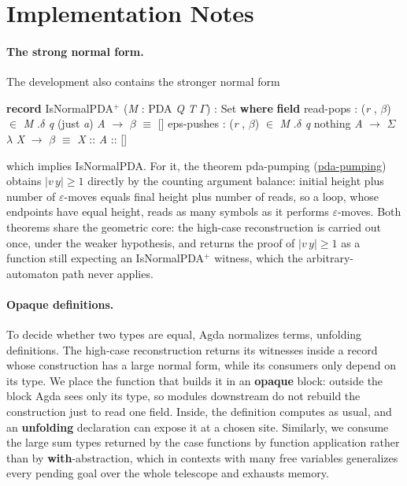 \documentclass[runningheads]{llncs}
\newcommand{\blueFG}[1]{\textcolor[rgb]{0,0,0.8}{#1}}
\newcommand{\redFG}[1]{\textcolor[rgb]{0.6,0,0}{#1}}
\newcommand{\greenFG}[1]{\textcolor[rgb]{0,0.4,0}{#1}}
\newcommand{\purpleFG}[1]{\textcolor[rgb]{0.4,0,0.4}{#1}}
\newcommand{\D}[1]{{\blueFG{\textsf{#1}}}}      %
\newcommand{\Con}[1]{{\redFG{\textsf{#1}}}}     %
\newcommand{\F}[1]{{\greenFG{\textsf{#1}}}}     %
\newcommand{\V}[1]{{\purpleFG{\textit{#1}}}}    %
\newcommand{\Kw}[1]{\textbf{#1}}                %
\newcommand{\agdarev}{9ac99a00bb1dc0047eca6ac9ab8f15585acb3577}
\newcommand{\agdarepo}{https://github.com/lives-group/pda-pumping/blob/\agdarev/src}
\newcommand{\agdalink}[3]{\href{\agdarepo/#1\#L#2}{\F{#3}}}
\newcommand{\kto}{\ensuremath{\to}}
\newcommand{\kin}{\ensuremath{\in}}
\newcommand{\keq}{\ensuremath{\equiv}}
\newcommand{\kp}[1]{\ensuremath{^{#1}}}
\newcommand{\kla}{\ensuremath{\lambda}}
\newcommand{\kSigma}{\ensuremath{\Sigma}}
\newcommand{\kb}{\ensuremath{\beta}}
\newcommand{\kG}{\ensuremath{\Gamma}}   %
\newcommand{\kd}{\ensuremath{\delta}}
\begin{document}
\section{Implementation Notes}\label{app:extra}

\paragraph{The strong normal form.} The development also contains the stronger
normal form
\begin{spec}
\Kw{record} \D{IsNormalPDA\kp{+}} (\V{M} : \D{PDA} \V{Q} \V{T} \V{\kG{}}) : \D{Set} \Kw{where}
   \Kw{field}
      \F{read-pops}  : (\V{r} , \V{\kb{}}) \kin{} \V{M} \F{.\kd{}} \V{q} (\Con{just} \V{a}) \V{A} \kto{} \V{\kb{}} \keq{} []
      \F{eps-pushes} : (\V{r} , \V{\kb{}}) \kin{} \V{M} \F{.\kd{}} \V{q} \Con{nothing} \V{A} \kto{}
                  \D{\kSigma{}} \kla{} \V{X} \kto{} \V{\kb{}} \keq{} \V{X} :: \V{A} :: []
\end{spec}
which implies \F{IsNormalPDA}. For it, the theorem \F{pda-pumping}
(\agdalink{PDA/Pumping/Lemma.agda}{76}{pda-pumping}) obtains $|v\,y| \geq 1$
directly by the counting argument \F{balance}: initial height plus number of
$\varepsilon$-moves equals final height plus number of reads, so a loop, whose
endpoints have equal height, reads as many symbols as it performs
$\varepsilon$-moves. Both theorems share the geometric core: the high-case
reconstruction is carried out once, under the weaker hypothesis, and returns the
proof of $|v\,y| \geq 1$ as a function still expecting an
\D{IsNormalPDA\kp{+}} witness, which the arbitrary-automaton path never applies.

\paragraph{Opaque definitions.} To decide whether two types are equal, Agda
normalizes terms, unfolding definitions. The high-case reconstruction returns
its witnesses inside a record whose construction has a large normal form, while
its consumers only depend on its type. We place the function that builds it in
an \Kw{opaque} block: outside the block Agda sees only its type, so modules
downstream do not rebuild the construction just to read one field. Inside, the
definition computes as usual, and an \Kw{unfolding} declaration can expose it at
a chosen site. Similarly, we consume the large sum types returned by the case
functions by function application rather than by \Kw{with}-abstraction, which in
contexts with many free variables generalizes every pending goal over the whole
telescope and exhausts memory.
\end{document}
